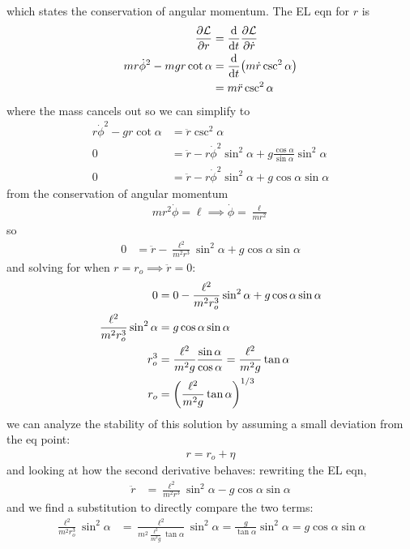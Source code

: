 \documentclass[../hw.tex]{subfiles}
\begin{document}
which states the conservation of angular momentum. The EL eqn for $r$ is
\begin{align*}
    \pdv{\mathcal{L}}{r} &= \dv{t} \pdv{\mathcal{L}}{\dot r} \\
    mr\dot\phi^2 - mgr \cot\alpha &= \dv{t}(m\dot r \csc^2\alpha) \\
    &= m\ddot r \csc^2\alpha
\end{align*}
where the mass cancels out so we can simplify to
\begin{align*}
    r\dot\phi^2 - gr \cot\alpha &= \ddot r \csc^2\alpha \\
    0 &= \ddot r - r \dot\phi^2 \sin^2\alpha + g \frac{\cos\alpha}{\sin\alpha} \sin^2\alpha \\
    0 &= \ddot r - r \dot\phi^2 \sin^2\alpha + g \cos\alpha \sin\alpha
\end{align*}
from the conservation of angular momentum
\begin{align*}
    m r^2 \dot \phi = \ell \implies \dot \phi = \frac{\ell}{mr^2}
\end{align*}
so
\begin{align*}
    0 &= \ddot r - \frac{\ell^2}{m^2 r^3} \sin^2\alpha + g \cos\alpha \sin\alpha 
\end{align*}
and solving for when $r = r_o \implies \ddot r = 0$:
\begin{align*}
    0 &= 0 - \frac{\ell^2}{m^2 r_o^3} \sin^2\alpha + g \cos\alpha \sin\alpha \\
    \frac{\ell^2}{m^2 r_o^3} \sin^2\alpha &= g \cos\alpha \sin\alpha \\
    r_o^3 &= \frac{\ell^2}{m^2 g} \frac{\sin\alpha}{\cos\alpha} = \frac{\ell^2}{m^2 g} \tan\alpha \\
    r_o &= \qt(\frac{\ell^2}{m^2 g} \tan\alpha)^{1/3}
\end{align*}
we can analyze the stability of this solution by assuming a small deviation from the eq point:
\begin{align*}
    r = r_o + \eta 
\end{align*}
and looking at how the second derivative behaves: rewriting the EL eqn,
\begin{align*}
    \ddot r &= \frac{\ell^2}{m^2 r^3} \sin^2\alpha - g \cos\alpha \sin\alpha
\end{align*}
and we find a substitution to directly compare the two terms:
\begin{align*}
    \frac{\ell^2}{m^2 r_o^3} \sin^2\alpha &= \frac{\ell^2}{m^2 \frac{\ell^2}{m^2 g} \tan\alpha} \sin^2\alpha
        = \frac{g}{\tan\alpha} \sin^2\alpha = g \cos\alpha \sin\alpha
\end{align*}
\end{document}
